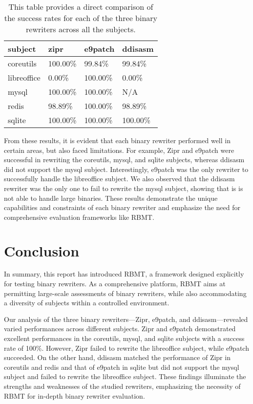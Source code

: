 \documentclass[a4paper,11pt,oneside]{report}
\begin{document}
    \begin{table}[h]
    \centering
    \caption{This table provides a direct comparison of the success rates for each of the three binary rewriters across all the subjects.}
    \begin{tabular}{|l|l|l|l|}
    \hline
    subject & zipr & e9patch & ddisasm \\ \hline
    coreutils & 100.00\% & 99.84\% & 99.84\% \\ \hline
    libreoffice & 0.00\% & 100.00\% & 0.00\% \\ \hline
    mysql & 100.00\% & 100.00\% & N/A \\ \hline
    redis & 98.89\% & 100.00\% & 98.89\% \\ \hline
    sqlite & 100.00\% & 100.00\% & 100.00\% \\ \hline
    \end{tabular}
    \end{table}
    \FloatBarrier
    From these results, it is evident that each binary rewriter performed well in certain areas, 
    but also faced limitations. For example, Zipr and e9patch were successful in rewriting the coreutils, 
    mysql, and sqlite subjects, whereas ddisasm did not support the mysql subject. Interestingly, e9patch
    was the only rewriter to successfully handle the libreoffice subject.
    We also observed that the ddisasm rewriter was the only one to fail to rewrite the mysql subject,
    showing that is is not able to handle large binaries.
    These results demonstrate the 
    unique capabilities and constraints of each binary rewriter and emphasize the need for comprehensive 
    evaluation frameworks like RBMT.

\chapter{Conclusion}

In summary, this report has introduced RBMT, a framework designed explicitly for testing binary rewriters. 
As a comprehensive platform, RBMT aims at permitting large-scale assessments of binary rewriters, while also accommodating a 
diversity of subjects within a controlled environment.

Our analysis of the three binary rewriters—Zipr, e9patch, and ddisasm—revealed varied performances across different subjects.
Zipr and e9patch demonstrated excellent performances in the coreutils, mysql, and sqlite subjects with a success rate of 100\%.
However, Zipr failed to rewrite the libreoffice subject, while e9patch succeeded. On the other hand, ddisasm matched the performance 
of Zipr in coreutils and redis and that of e9patch in sqlite but did not support the mysql subject and failed to rewrite the libreoffice subject. 
These findings illuminate the strengths and weaknesses of the studied rewriters, emphasizing the necessity of RBMT for in-depth 
binary rewriter evaluation.
\end{document}
